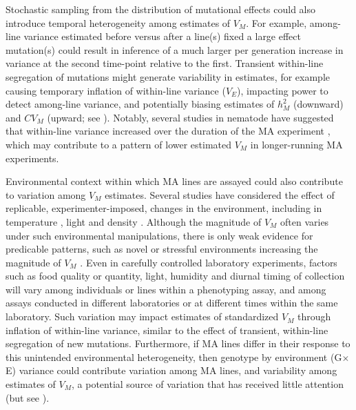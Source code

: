 Stochastic sampling from the distribution of mutational effects could also introduce temporal heterogeneity among estimates of $V_M$. For example, among-line variance estimated before versus after a line(s) fixed a large effect mutation(s) could result in inference of a much larger per generation increase in variance at the second time-point relative to the first. Transient within-line segregation of mutations might generate variability in estimates, for example causing temporary inflation of within-line variance ($V_E$), impacting power to detect among-line variance, and potentially biasing estimates of $h^2_M$ (downward) and $CV_M$ (upward; see \citealp{Hoff16}). Notably, several studies in nematode have suggested that within-line variance increased over the duration of the MA experiment \citep{Baer08,Baer10a,Brae10}, which may contribute to a pattern of lower estimated $V_M$ in longer-running MA experiments. \par

Environmental context within which MA lines are assayed could also contribute to variation among $V_M$ estimates. Several studies have considered the effect of replicable, experimenter-imposed, changes in the environment, including in temperature \citep{Wayn98}, light \citep{Kava05} and density \citep{Fry96}. Although the magnitude of $V_M$ often varies under such environmental manipulations, there is only weak evidence for predicable patterns, such as novel or stressful environments increasing the magnitude of $V_M$ \citep{Kond94,Mart06}. Even in carefully controlled laboratory experiments, factors such as food quality or quantity, light, humidity and diurnal timing of collection will vary among individuals or lines within a phenotyping assay, and among assays conducted in different laboratories or at different times within the same laboratory. Such variation may impact estimates of standardized $V_M$ through inflation of within-line variance, similar to the effect of transient, within-line segregation of new mutations. Furthermore, if MA lines differ in their response to this unintended environmental heterogeneity, then genotype by environment (G$\times$E) variance could contribute variation among MA lines, and variability among estimates of $V_M$, a potential source of variation that has received little attention (but see \citealp{Garc00}).\par


